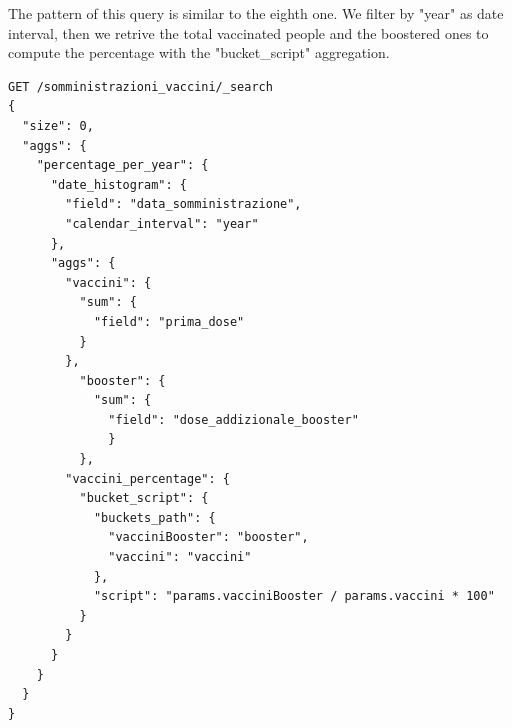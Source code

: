 \documentclass{article}
\begin{document}
\begin{enumerate}
The pattern of this query is similar to the eighth one. We filter by "year" as date interval, then we retrive the total vaccinated people and the boostered ones to compute the percentage with the "bucket\_script" aggregation.
\begin{lstlisting}
GET /somministrazioni_vaccini/_search
{ 
  "size": 0,
  "aggs": {
    "percentage_per_year": {
      "date_histogram": {
        "field": "data_somministrazione",
        "calendar_interval": "year"
      },
      "aggs": {
        "vaccini": {
          "sum": {
            "field": "prima_dose"
          }
        },
          "booster": {
            "sum": {
              "field": "dose_addizionale_booster"
              }
          },
        "vaccini_percentage": {
          "bucket_script": {
            "buckets_path": {
              "vacciniBooster": "booster",
              "vaccini": "vaccini"
            },
            "script": "params.vacciniBooster / params.vaccini * 100"
          }
        }
      }
    }
  }
}
\end{lstlisting}
\end{enumerate}
\end{document}
